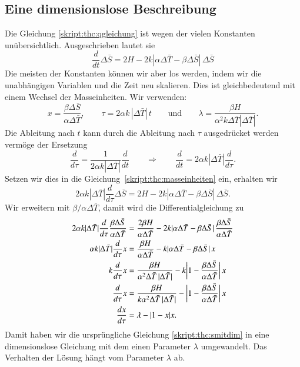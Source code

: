 \subsection{Eine dimensionslose Beschreibung}
Die Gleichung \eqref{skript:thc:qgleichung} ist wegen der vielen
Konstanten unübersichtlich.
Ausgeschrieben lautet sie
\begin{equation}
\frac{d}{dt}\Delta\bar S
=
2H
-2k|\alpha\Delta\bar T- \beta \Delta\bar S|\,\Delta\bar S
\label{skript:thc:smitdim}
\end{equation}
Die meisten der Konstanten können wir aber los werden, indem wir 
die unabhängigen Variablen und die Zeit neu skalieren.
Dies ist gleichbedeutend mit einem Wechsel der Masseinheiten.
Wir verwenden:
\begin{equation}
x=\frac{\beta\Delta\bar S}{\alpha\Delta\bar T},
\qquad
\tau = 2\alpha k\,|\Delta\bar T|\, t
\qquad\text{und}\qquad
\lambda = \frac{\beta H}{\alpha^2 k\Delta\bar T|\Delta\bar T|}.
\label{skript:thc:masseinheiten}
\end{equation}
Die Ableitung nach $t$ kann durch die Ableitung nach $\tau$ ausgedrücket
werden vermöge der Ersetzung
\[
\frac{d}{d\tau}
=
\frac{1}{2\alpha k|\Delta\bar T|}
\frac{d}{dt}
\qquad\Rightarrow\qquad
\frac{d}{dt}
=
2\alpha k|\Delta\bar T|\frac{d}{d\tau}.
\]
Setzen wir dies in die Gleichung~\eqref{skript:thc:masseinheiten}
ein, erhalten wir
\begin{equation}
2\alpha k|\Delta\bar T|
\frac{d}{d\tau} \Delta\bar S
=
2H-2k|\alpha\Delta\bar T-\beta\Delta\bar S|\,\Delta\bar S.
\end{equation}
Wir erweitern mit $\beta/\alpha\Delta\bar T$, damit wird die
Differentialgleichung zu
\begin{align}
2\alpha k|\Delta\bar T|
\frac{d}{d\tau}\frac{\beta\Delta\bar S}{\alpha\Delta\bar T}
&=
\frac{2\beta H}{\alpha\Delta\bar T} - 2k|\alpha\Delta\bar T-\beta\Delta\bar S|\,
\frac{\beta\Delta\bar S}{\alpha\Delta\bar T}
\notag
\\
\alpha k|\Delta\bar T|
\frac{d}{d\tau}x
&=
\frac{\beta H}{\alpha\Delta\bar T}
-k|\alpha\Delta\bar T-\beta\Delta\bar S|\, x
\notag
\\
k
\frac{d}{d\tau}x
&=
\frac{\beta H}{\alpha^2\Delta\bar T\,|\Delta\bar T|}
-k\biggl|1-\frac{\beta\Delta\bar S}{\alpha\Delta\bar T}\biggr|\,x
\notag
\\
\frac{d}{d\tau}x
&=
\frac{\beta H}{k\alpha^2\Delta\bar T\,|\Delta\bar T|}
-\biggl|1-\frac{\beta\Delta\bar S}{\alpha\Delta\bar T}\biggr|\,x
\notag
\\
\frac{dx}{d\tau}
&=
\lambda - |1-x|x.
\label{skript:thc:dimensionslos}
\end{align}
Damit haben wir die ursprüngliche Gleichung
\eqref{skript:thc:smitdim}
in eine dimensionslose Gleichung mit dem einen Parameter $\lambda$
umgewandelt.
Das Verhalten der Lösung hängt vom Parameter $\lambda$ ab.

